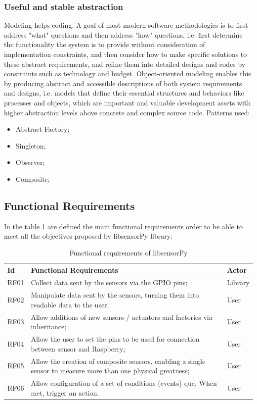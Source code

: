 \documentclass{acm_proc_article-sp}
\begin{document}
\subsubsection{Useful and stable abstraction}

Modeling helps coding. A goal of most modern software methodologies is to first address "what" questions and then address "how" questions, i.e. first determine the functionality the system is to provide without consideration of implementation constraints, and then consider how to make specific solutions to these abstract requirements, and refine them into detailed designs and codes by constraints such as technology and budget. Object-oriented modeling enables this by producing abstract and accessible descriptions of both system requirements and designs, i.e. models that define their essential structures and behaviors like processes and objects, which are important and valuable development assets with higher abstraction levels above concrete and complex source code.
\newline
\newline
Patterns used:
\begin{itemize}
\item Abstract Factory;
\item Singleton;
\item Observer;
\item Composite;
\end{itemize}

\subsection{Functional Requirements}
In the table \ref{table:rf} are defined the main functional requirements order to be able to meet all the objectives proposed by libsensorPy library:
 
\begin{table}[h]
 \caption{Functional requirements of libsensorPy}
 \label{table:rf}
 \begin{tabular}{|l|p{5.5cm}|l|}
 \hline  
 Id & Functional Requirements & Actor \\
 \hline  
 RF01 & Collect data sent by the sensors via the GPIO pins; & Library \\
 \hline 
 RF02 & Manipulate data sent by the sensors, turning them into readable data to the user; & User \\
 \hline 
 RF03 & Allow additions of new sensors / actuators and factories via inheritance; & User \\
 \hline 
 RF04 & Allow the user to set the pins to be used for connection between sensor and Raspberry; & User \\
 \hline 
 RF05 & Allow the creation of composite sensors, enabling a single sensor to measure more than one physical greatness; & User \\
 \hline 
 RF06 & Allow configuration of a set of conditions (events) que, When met, trigger an action. & User \\
\hline  
\end{tabular}
\end{table}
\end{document}
